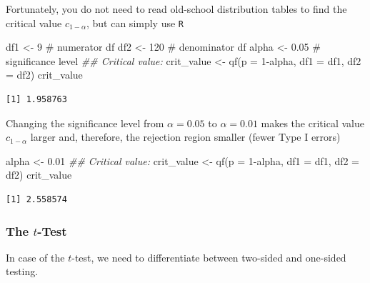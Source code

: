 \documentclass[
  letterpaper,
  DIV=11,
  numbers=noendperiod]{scrreprt}
\newenvironment{Shaded}{\begin{snugshade}}{\end{snugshade}}
\newcommand{\AttributeTok}[1]{\textcolor[rgb]{0.40,0.45,0.13}{#1}}
\newcommand{\CommentTok}[1]{\textcolor[rgb]{0.37,0.37,0.37}{#1}}
\newcommand{\DecValTok}[1]{\textcolor[rgb]{0.68,0.00,0.00}{#1}}
\newcommand{\DocumentationTok}[1]{\textcolor[rgb]{0.37,0.37,0.37}{\textit{#1}}}
\newcommand{\FloatTok}[1]{\textcolor[rgb]{0.68,0.00,0.00}{#1}}
\newcommand{\FunctionTok}[1]{\textcolor[rgb]{0.28,0.35,0.67}{#1}}
\newcommand{\NormalTok}[1]{\textcolor[rgb]{0.00,0.23,0.31}{#1}}
\newcommand{\OtherTok}[1]{\textcolor[rgb]{0.00,0.23,0.31}{#1}}
\newcommand{\SpecialCharTok}[1]{\textcolor[rgb]{0.37,0.37,0.37}{#1}}
\theoremstyle{definition}
\theoremstyle{plain}
\theoremstyle{plain}
\theoremstyle{remark}
\begin{document}
Fortunately, you do not need to read old-school distribution tables to
find the critical value \(c_{1-\alpha}\), but can simply use \texttt{R}

\begin{Shaded}
\begin{Highlighting}[]
\NormalTok{df1   }\OtherTok{\textless{}{-}} \DecValTok{9}    \CommentTok{\# numerator df}
\NormalTok{df2   }\OtherTok{\textless{}{-}} \DecValTok{120}  \CommentTok{\# denominator df}
\NormalTok{alpha }\OtherTok{\textless{}{-}} \FloatTok{0.05} \CommentTok{\# significance level}
\DocumentationTok{\#\# Critical value:}
\NormalTok{crit\_value }\OtherTok{\textless{}{-}} \FunctionTok{qf}\NormalTok{(}\AttributeTok{p =} \DecValTok{1}\SpecialCharTok{{-}}\NormalTok{alpha, }\AttributeTok{df1 =}\NormalTok{ df1, }\AttributeTok{df2 =}\NormalTok{ df2)}
\NormalTok{crit\_value}
\end{Highlighting}
\end{Shaded}

\begin{verbatim}
[1] 1.958763
\end{verbatim}

\noindent Changing the significance level from \(\alpha=0.05\) to
\(\alpha=0.01\) makes the critical value \(c_{1-\alpha}\) larger and,
therefore, the rejection region smaller (fewer Type I errors)

\begin{Shaded}
\begin{Highlighting}[]
\NormalTok{alpha }\OtherTok{\textless{}{-}} \FloatTok{0.01}
\DocumentationTok{\#\# Critical value:}
\NormalTok{crit\_value }\OtherTok{\textless{}{-}} \FunctionTok{qf}\NormalTok{(}\AttributeTok{p =} \DecValTok{1}\SpecialCharTok{{-}}\NormalTok{alpha, }\AttributeTok{df1 =}\NormalTok{ df1, }\AttributeTok{df2 =}\NormalTok{ df2)}
\NormalTok{crit\_value}
\end{Highlighting}
\end{Shaded}

\begin{verbatim}
[1] 2.558574
\end{verbatim}

\hypertarget{the-t-test}{%
\subsubsection*{\texorpdfstring{The
\(t\)-Test}{The t-Test}}\label{the-t-test}}

In case of the \(t\)-test, we need to differentiate between two-sided
and one-sided testing.
\end{document}
